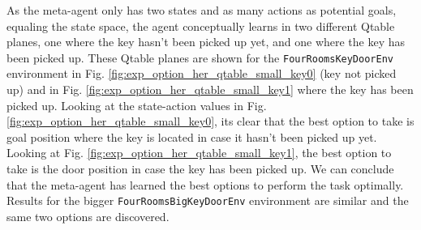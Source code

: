 \documentclass[conference]{IEEEtran}
\begin{document}
As the meta-agent only has two states and as many actions as potential goals, equaling the state space, the agent conceptually learns in two different Qtable planes, one where the key hasn't been picked up yet, and one where the key has been picked up. These Qtable planes are shown for the \texttt{FourRoomsKeyDoorEnv} environment in Fig. \ref{fig:exp_option_her_qtable_small_key0} (key not picked up) and in Fig. \ref{fig:exp_option_her_qtable_small_key1} where the key has been picked up. Looking at the state-action values in Fig. \ref{fig:exp_option_her_qtable_small_key0}, its clear that the best option to take is goal position where the key is located in case it hasn't been picked up yet. Looking at Fig. \ref{fig:exp_option_her_qtable_small_key1}, the best option to take is the door position in case the key has been picked up. We can conclude that the meta-agent has learned the best options to perform the task optimally. Results for the bigger \texttt{FourRoomsBigKeyDoorEnv} environment are similar and the same two options are discovered.
\end{document}

